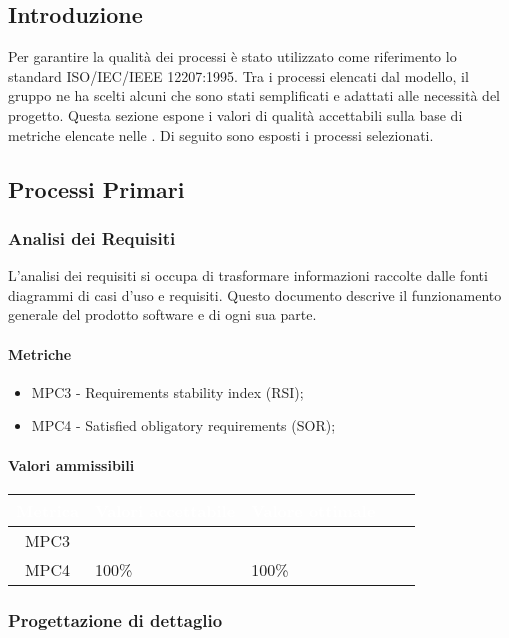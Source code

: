 
\subsection{Introduzione}
Per garantire la qualità dei processi è stato utilizzato come riferimento lo standard ISO/IEC/IEEE 12207:1995. Tra i processi elencati dal modello, il gruppo ne ha scelti alcuni che sono stati semplificati e adattati alle necessità del progetto. Questa sezione espone i valori di qualità accettabili sulla base di metriche elencate nelle . Di seguito sono esposti i processi selezionati.

\subsection{Processi Primari}
\subsubsection{Analisi dei Requisiti}
L'analisi dei requisiti si occupa di trasformare informazioni raccolte dalle fonti diagrammi di casi d'uso e requisiti. Questo documento descrive il funzionamento generale del prodotto software e di ogni sua parte.
\paragraph{Metriche}
\begin{itemize}
	\item MPC3 - Requirements stability index (RSI);
	\item MPC4 - Satisfied obligatory requirements (SOR);
\end{itemize}


\paragraph{Valori ammissibili}
{
\renewcommand{\arraystretch}{1.5}
\centering
\begin{longtable}{c C{2.6cm} C{3cm} C{2.6cm} C{5cm}}
\textcolor{white}{\textbf{Metrica}}&
\textcolor{white}{\textbf{Valori accettabile}}&
\textcolor{white}{\textbf{Valore ottimale}}\\	
\endhead

MPC3 &   &  \\
MPC4 & 100\% & 100\%
\end{longtable}
}



\subsubsection{Progettazione di dettaglio}